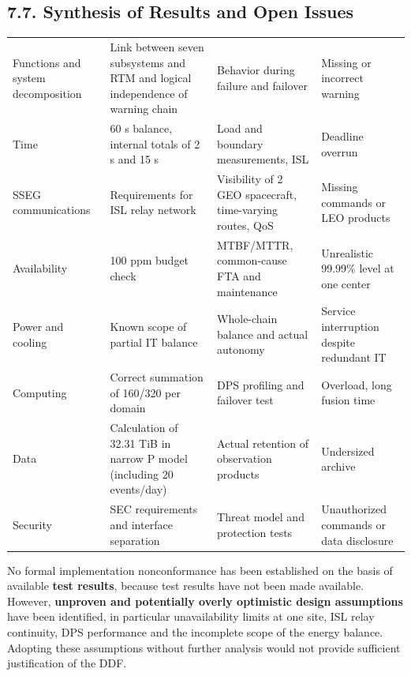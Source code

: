 \subsection{7.7. Synthesis of Results and Open Issues}\label{ddjf-7-7}

\begingroup{}
\begin{longtable}{|P{0.14}|P{0.30}|P{0.35}|P{0.21}|}
\hline{}
 &  &  & \\ \hline
\endhead
\hline\endlastfoot
Functions and system decomposition & Link between seven subsystems and RTM and logical independence of warning chain & Behavior during failure and failover & Missing or incorrect warning\\ \hline
Time & 60 s balance, internal totals of 2 s and 15 s & Load and boundary measurements, ISL & Deadline overrun\\ \hline
SSEG communications & Requirements for ISL relay network & Visibility of 2 GEO spacecraft, time-varying routes, QoS & Missing commands or LEO products\\ \hline
Availability & 100 ppm budget check & MTBF/\allowbreak{}MTTR, common-cause FTA and maintenance & Unrealistic 99.99\% level at one center\\ \hline
Power and cooling & Known scope of partial IT balance & Whole-chain balance and actual autonomy & Service interruption despite redundant IT\\ \hline
Computing & Correct summation of 160/\allowbreak{}320 per domain & DPS profiling and failover test & Overload, long fusion time\\ \hline
Data & Calculation of 32.31 TiB in narrow P model (including 20 events/\allowbreak{}day) & Actual retention of observation products & Undersized archive\\ \hline
Security & SEC requirements and interface separation & Threat model and protection tests & Unauthorized commands or data disclosure\\*
\end{longtable}
\endgroup

No formal implementation nonconformance has been established on the basis of available \textbf{test results}, because test results have not been made available. However, \textbf{unproven and potentially overly optimistic design assumptions} have been identified, in particular unavailability limits at one site, ISL relay continuity, DPS performance and the incomplete scope of the energy balance. Adopting these assumptions without further analysis would not provide sufficient justification of the DDF.

